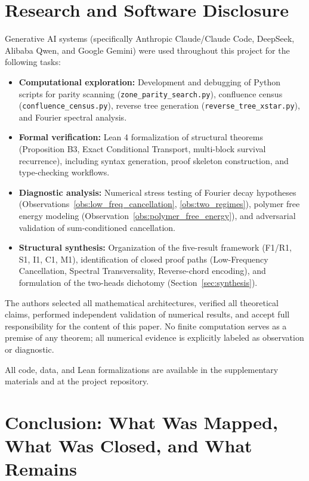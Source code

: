 \documentclass[12pt,a4paper]{article}
\begin{document}
\section{Research and Software Disclosure}
\label{sec:disclosure}

Generative AI systems (specifically Anthropic Claude/Claude Code, DeepSeek, 
Alibaba Qwen, and Google Gemini) were used throughout this project for the 
following tasks:

\begin{itemize}
\item \textbf{Computational exploration:} Development and debugging of Python 
scripts for parity scanning (\texttt{zone\_parity\_search.py}), confluence 
census (\texttt{confluence\_census.py}), reverse tree generation 
(\texttt{reverse\_tree\_xstar.py}), and Fourier spectral analysis.

\item \textbf{Formal verification:} Lean 4 formalization of structural 
theorems (Proposition B3, Exact Conditional Transport, multi-block survival 
recurrence), including syntax generation, proof skeleton construction, and 
type-checking workflows.

\item \textbf{Diagnostic analysis:} Numerical stress testing of Fourier decay 
hypotheses (Observations~\ref{obs:low_freq_cancellation}, 
\ref{obs:two_regimes}), polymer free energy modeling 
(Observation~\ref{obs:polymer_free_energy}), and adversarial validation of 
sum-conditioned cancellation.

\item \textbf{Structural synthesis:} Organization of the five-result framework 
(F1/R1, S1, I1, C1, M1), identification of closed proof paths 
(Low-Frequency Cancellation, Spectral Transversality, Reverse-chord encoding), 
and formulation of the two-heads dichotomy (Section~\ref{sec:synthesis}).
\end{itemize}

The authors selected all mathematical architectures, verified all theoretical 
claims, performed independent validation of numerical results, and accept full 
responsibility for the content of this paper. No finite computation serves as 
a premise of any theorem; all numerical evidence is explicitly labeled as 
observation or diagnostic.

All code, data, and Lean formalizations are available in the supplementary 
materials and at the project repository.

\section{Conclusion: What Was Mapped, What Was Closed, and What Remains}
\label{sec:conclusion}
\end{document}
